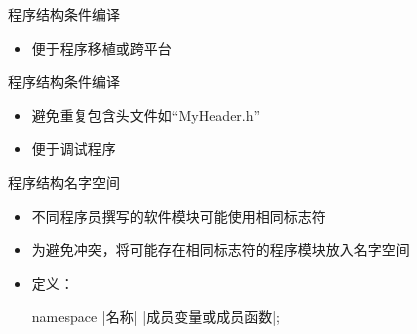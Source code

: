 \begin{frame}[fragile]{程序结构}{条件编译}
  \begin{itemize}
  \item 便于程序移植或跨平台
  \end{itemize}
  \begin{center}
    \begin{minipage}{0.4\linewidth}
    \end{minipage}\qquad
    \begin{minipage}{0.4\linewidth}
    \end{minipage}
  \end{center}
\end{frame}

\begin{frame}[fragile]{程序结构}{条件编译}
  \begin{itemize}
  \item 避免重复包含头文件如``MyHeader.h''\\
    \begin{center}
      \begin{minipage}{0.4\linewidth}
      \end{minipage}
    \end{center}
  \item 便于调试程序\\
    \begin{center}
      \begin{minipage}{0.4\linewidth}
      \end{minipage}
    \end{center}
  \end{itemize}
\end{frame}

\begin{frame}[fragile]{程序结构}{名字空间}
  \stretchon
  \begin{itemize}
  \item 不同程序员撰写的软件模块可能使用相同标志符
  \item 为避免冲突，将可能存在相同标志符的程序模块放入名字空间
  \item 定义：
    \begin{minipage}{0.8\linewidth}
      \begin{cpptt}
namespace |名称|
{
   |成员变量或成员函数|;
}
        \end{cpptt}
      \end{minipage}
    \end{itemize}
    \stretchoff
\end{frame}


